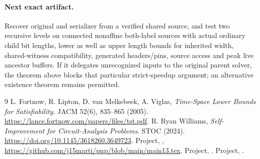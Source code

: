 \documentclass[11pt]{article}
\begin{document}
\paragraph{Next exact artifact.}
Recover original  and serializer from a verified shared source, and test two recursive levels on connected nonaffine both-label sources with actual ordinary child bit lengths, lower as well as upper length bounds for inherited width, shared-witness compatibility, generated headers/pins, source access and peak live ancestor buffers. If it delegates unrecognized inputs to the original parent solver, the theorem above blocks that particular strict-speedup argument; an alternative existence theorem remains permitted.

\begin{thebibliography}{9}
 L. Fortnow, R. Lipton, D. van Melkebeek, A. Viglas, \emph{Time-Space Lower Bounds for Satisfiability}. JACM 52(6), 835--865 (2005). \url{https://lance.fortnow.com/papers/files/tst.pdf}.
 R. Ryan Williams, \emph{Self-Improvement for Circuit-Analysis Problems}. STOC (2024). \url{https://doi.org/10.1145/3618260.3649723}.
 Project, , \url{https://github.com/j15marti/pnp/blob/main/main13.tex}.
 Project, .
 Project, .
\end{thebibliography}
\end{document}

